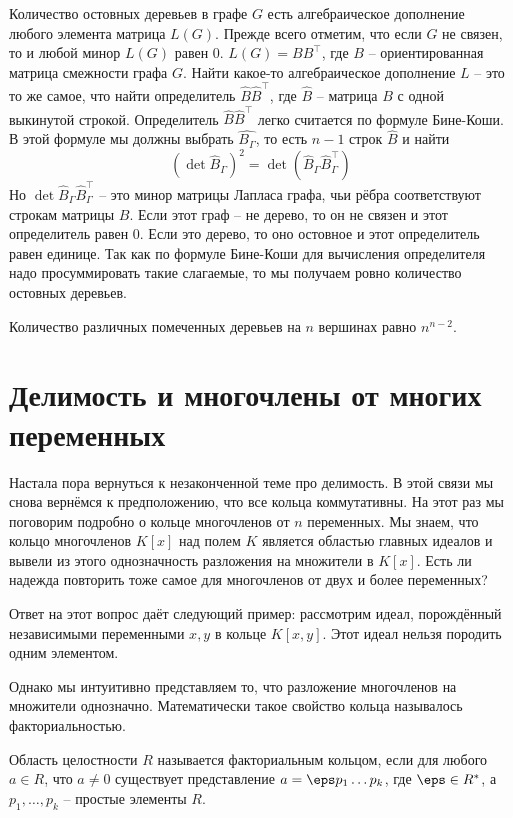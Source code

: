  Количество остовных деревьев в графе $G$ есть алгебраическое дополнение любого элемента матрица $L(G)$.
\ecrl
\proof Прежде всего отметим, что если $G$ не связен, то и любой минор $L(G)$ равен $0$. $L(G)=BB^\top$, где $B$ -- ориентированная матрица смежности графа $G$. Найти какое-то алгебраическое дополнение $L$ -- это то же самое, что найти определитель $\hat{B}\hat{B}^\top$, где $\hat{B}$ -- матрица $B$ с одной выкинутой строкой. Определитель $\hat B \hat{B}^\top$ легко считается по формуле Бине-Коши. В этой формуле мы должны выбрать $\hat{B_{\Gamma}}$, то есть $n-1$ строк $\hat{B}$ и найти
$$(\det \hat{B}_{\Gamma})^2=\det(\hat{B}_{\Gamma} \hat{B}_{\Gamma}^\top)$$
Но $\det \hat{B}_{\Gamma} \hat{B}_{\Gamma}^\top$ -- это минор матрицы Лапласа графа, чьи рёбра соответствуют строкам матрицы $B$. Если этот граф  -- не дерево, то он не связен и этот определитель равен $0$. Если это дерево, то оно остовное и этот определитель равен единице. Так как по формуле Бине-Коши для вычисления определителя надо просуммировать такие слагаемые, то мы получаем ровно количество остовных деревьев.
\endproof


 Количество различных помеченных деревьев на $n$ вершинах равно $n^{n-2}$.
\ecrl


\chapter{Делимость и многочлены от многих переменных}

Настала пора вернуться к незаконченной теме про делимость. В этой связи мы снова вернёмся к предположению, что все кольца коммутативны. На этот раз мы поговорим подробно о кольце многочленов от $n$ переменных. Мы знаем, что кольцо многочленов $K[x]$ над полем $K$ является областью главных идеалов и вывели из этого однозначность разложения на множители в $K[x]$. Есть ли надежда повторить тоже самое для многочленов от двух и более переменных? 

Ответ на этот вопрос даёт следующий пример: рассмотрим идеал, порождённый независимыми переменными $x,y$ в кольце $K[x,y]$. Этот идеал нельзя породить одним элементом.

Однако мы интуитивно представляем то, что разложение многочленов на множители однозначно. Математически такое свойство кольца называлось факториальностью.

\dfn
Область целостности $R$ называется факториальным кольцом, если для любого $a\in R$, что $a\neq 0$  существует представление $a=\eps p_1\dots p_k$, где $\eps \in R^*$, а $p_1,\dots,p_k$ -- простые элементы $R$.
\edfn

